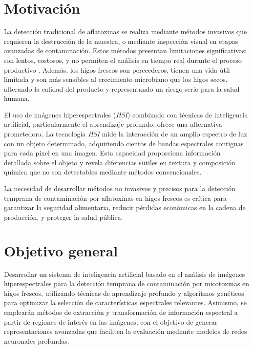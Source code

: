 \section{Motivación}
La detección tradicional de aflatoxinas se realiza mediante métodos invasivos que requieren la destrucción de la muestra, o mediante inspección visual en etapas avanzadas de contaminación. Estos métodos presentan limitaciones significativas: son lentos, costosos, y no permiten el análisis en tiempo real durante el proceso productivo \cite{KHAN2022101678}. Además, los higos frescos son perecederos, tienen una vida útil limitada y son más sensibles al crecimiento microbiano que los higos secos, alterando la calidad del producto y representando un riesgo serio para la salud humana.

\vspace{5mm}

El uso de imágenes hiperespectrales (\emph{HSI}) combinado con técnicas de inteligencia artificial, particularmente el aprendizaje profundo, ofrece una alternativa prometedora. La tecnología \emph{HSI} mide la interacción de un amplio espectro de luz con un objeto determinado, adquiriendo cientos de bandas espectrales contiguas para cada píxel en una imagen. Esta capacidad proporciona información detallada sobre el objeto y revela diferencias sutiles en textura y composición química que no son detectables mediante métodos convencionales.

\vspace{5mm}

La necesidad de desarrollar métodos no invasivos y precisos para la detección temprana de contaminación por aflatoxinas en higos frescos es crítica para garantizar la seguridad alimentaria, reducir pérdidas económicas en la cadena de producción, y proteger la salud pública.

\section{Objetivo general}
Desarrollar un sistema de inteligencia artificial basado en el análisis de imágenes hiperespectrales para la detección temprana de contaminación por micotoxinas en higos frescos, utilizando técnicas de aprendizaje profundo y algoritmos genéticos para optimizar la selección de características espectrales relevantes. Asimismo, se emplearán métodos de extracción y transformación de información espectral a partir de regiones de interés en las imágenes, con el objetivo de generar representaciones avanzadas que faciliten la evaluación mediante modelos de redes neuronales profundas.

